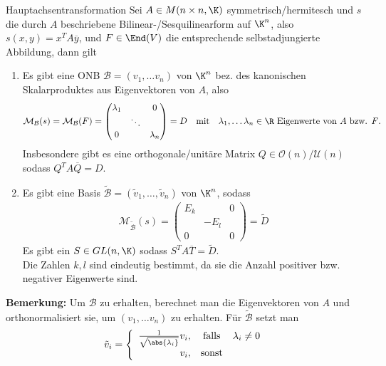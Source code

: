 \begin{nosatz}{Hauptachsentransformation}
    Sei $A \in M(n\times n,\K)$ symmetrisch/hermitesch und $s$ die durch $A$ beschriebene Bilinear-/Sesquilinearform auf $\K^n$, also $s(x,y) = x^T A \overline{y}$, und $F \in \End(V)$ die entsprechende selbstadjungierte Abbildung, dann gilt
    
    \begin{enumerate}
        \item	Es gibt eine ONB  $\mathcal{B} = (v_1, \ldots v_n)$ von $\K^n$ bez. des kanonischen Skalarproduktes aus Eigenvektoren von $A$, also
        \begin{align*}
            \mathcal{M}_{\mathcal{B}}(s) = \mathcal{M}_{\mathcal{B}}(F) = \begin{pmatrix}
                \lambda_1 & & 0\\
                 & \ddots & \\
                 0 & & \lambda_n
            \end{pmatrix} = D \quad \text{mit}\quad \lambda_1, \ldots \lambda_n \in \R \text{ Eigenwerte von $A$ bzw. $F$}.
        \end{align*}
        Insbesondere gibt es eine orthogonale/unitäre Matrix $Q \in \mathcal{O}(n)/ \mathcal{U}(n)$ sodass $Q^T A \overline{Q} = D$.
        \item   Es gibt eine Basis $\tilde{\mathcal{B}} = (\tilde{v}_1, \ldots, \tilde{v}_n)$ von $\K^n$, sodass 
        \begin{align*}
            \mathcal{M}_{\tilde{\mathcal{B}}}(s) = \begin{pmatrix}
                E_k & & 0\\
                & -E_l\\
                0 & & 0
            \end{pmatrix} = \tilde{D}
        \end{align*}
        Es gibt ein $S \in GL(n,\K)$ sodass $S^T A \overline{T} = \tilde{D}$.\\
        Die Zahlen $k,l$ sind eindeutig bestimmt, da sie die Anzahl positiver bzw. negativer Eigenwerte sind.
    \end{enumerate}
\end{nosatz}
\textbf{Bemerkung:} \quad   Um $\mathcal{B}$ zu erhalten, berechnet man die Eigenvektoren von $A$ und orthonormalisiert sie, um $(v_1, \ldots v_n)$ zu erhalten. Für $\tilde{\mathcal{B}}$ setzt man
\begin{align*}
    \tilde{v}_i = \left\{ \begin{array}{rcl}
        \frac{1}{\sqrt{\abs{\lambda_i}}} v_i, &\text{falls}& \lambda_i \neq 0\\
        v_i, &\text{sonst}
    \end{array} \right.
\end{align*}

